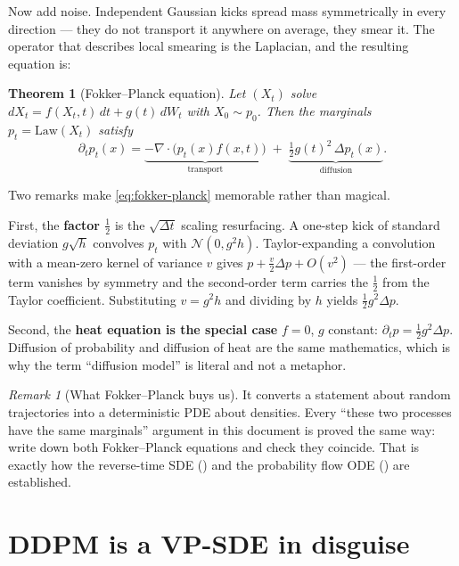 \documentclass[11pt,a4paper]{report}
\newtheorem{theorem}{Theorem}[chapter]
\theoremstyle{definition}
\theoremstyle{remark}
\newtheorem{remark}[remark]{Remark}
\begin{document}
Now add noise. Independent Gaussian kicks spread mass symmetrically in every
direction --- they do not transport it anywhere on average, they smear it.
The operator that describes local smearing is the Laplacian, and the
resulting equation is:

\begin{theorem}[Fokker--Planck equation]
\label{thm:fokker-planck}
Let $(X_t)$ solve $dX_t=f(X_t,t)\,dt+g(t)\,dW_t$ with $X_0\sim p_0$. Then
the marginals $p_t=\mathrm{Law}(X_t)$ satisfy
\begin{equation}
\label{eq:fokker-planck}
\partial_tp_t(x)
= \underbrace{-\nabla\cdot\bigl(p_t(x)f(x,t)\bigr)}_{\text{transport}}
\;+\; \underbrace{\tfrac12 g(t)^2\,\Delta p_t(x)}_{\text{diffusion}} .
\end{equation}
\end{theorem}

Two remarks make \eqref{eq:fokker-planck} memorable rather than magical.

First, the \textbf{factor $\tfrac12$} is the $\sqrt{\Delta t}$ scaling
resurfacing. A one-step kick of standard deviation $g\sqrt h$ convolves
$p_t$ with $\mathcal N(0,g^2h)$. Taylor-expanding a convolution with a
mean-zero kernel of variance $v$ gives $p + \tfrac{v}{2}\Delta p + O(v^2)$
--- the first-order term vanishes by symmetry and the second-order term
carries the $\tfrac12$ from the Taylor coefficient. Substituting $v=g^2h$
and dividing by $h$ yields $\tfrac12g^2\Delta p$.

Second, the \textbf{heat equation is the special case} $f=0$, $g$ constant:
$\partial_tp=\tfrac12g^2\Delta p$. Diffusion of probability and diffusion of
heat are the same mathematics, which is why the term ``diffusion model'' is
literal and not a metaphor.

\begin{remark}[What Fokker--Planck buys us]
\label{rem:fp-buys}
It converts a statement about random trajectories into a deterministic PDE
about densities. Every ``these two processes have the same marginals''
argument in this document is proved the same way: write down both
Fokker--Planck equations and check they coincide. That is exactly how the
reverse-time SDE () and the probability flow ODE
() are established.
\end{remark}

\section{DDPM is a VP-SDE in disguise}
\label{sec:sde-ddpm-limit}
\end{document}
